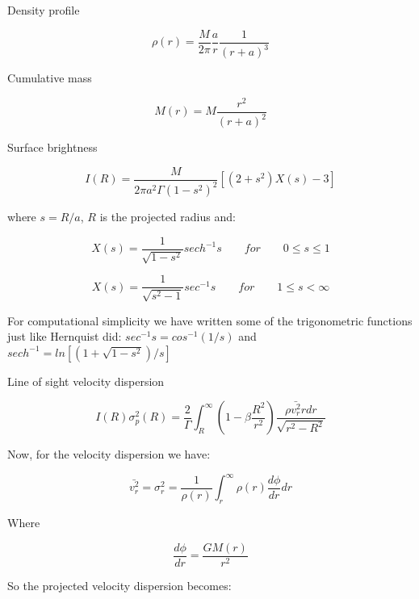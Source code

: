 Density profile

\begin{equation}
\rho(r)=\frac{M}{2\pi}\frac{a}{r}\frac{1}{\left(r+a\right)^{3}}
\end{equation}

Cumulative mass

\begin{equation}
M(r)=M\frac{r^{2}}{(r+a)^{2}}
\end{equation}
 
Surface brightness 
 
 \begin{equation}
 I(R)=\frac{M}{2\pi a^{2}\Gamma\left(1-s^{2}\right)^{2}}\left[\left(2+s^{2}\right)X(s)-3\right]
 \end{equation}
 
 where $s=R/a$, $R$ is the projected radius and:

\begin{equation}
X(s)=\frac{1}{\sqrt{1-s^{2}}}sech^{-1}s\qquad for\qquad0\leq s\leq1
\end{equation}

\begin{equation}
X(s)=\frac{1}{\sqrt{s^{2}-1}}sec^{-1}s\qquad for\qquad1\leq s<\infty
\end{equation}

For computational simplicity we have written some of the trigonometric functions just like Hernquist did: $sec^{-1}s = cos^{-1}(1/s)$ and $sech^{-1} = ln[(1+\sqrt{1-s^{2}})/s]$

Line of sight velocity dispersion

 \begin{equation}
 I(R)\sigma_{p}^{2}(R)=\frac{2}{\Gamma}\int_{R}^{\infty}\left(1-\beta\frac{R^{2}}{r^{2}}\right)\frac{\rho\bar{v_{r}^{2}}rdr}{\sqrt{r^{2}-R^{2}}}
 \end{equation}

Now, for the velocity dispersion we have:

\begin{equation}
\bar{v_{r}^{2}}=\sigma_{r}^{2}=\frac{1}{\rho(r)}\int_{r}^{\infty}\rho(r)\frac{d\phi}{dr}dr
\end{equation}

Where 

\begin{equation}
\frac{d\phi}{dr}=\frac{GM(r)}{r^{2}}
\end{equation}

So the projected velocity dispersion becomes:

